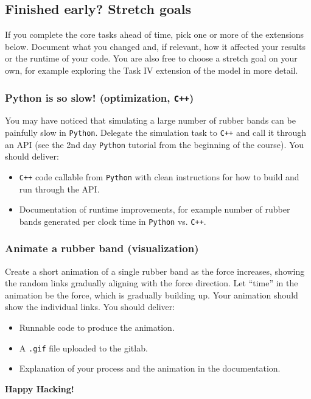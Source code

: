 \documentclass[11pt]{article}
\begin{document}
\subsection*{Finished early? Stretch goals}
If you complete the core tasks ahead of time, pick one or more of the extensions below. Document what you changed and, if relevant, how it affected your results or the runtime of your code. You are also free to choose a stretch goal on your own, for example exploring the Task IV extension of the model in more detail.

\subsubsection*{Python is so slow! (optimization, \texttt{C++})}
You may have noticed that simulating a large number of rubber bands can be painfully slow in \texttt{Python}. Delegate the simulation task to \texttt{C++} and call it through an API (see the 2nd day \texttt{Python} tutorial from the beginning of the course). You should deliver:
\begin{itemize}
  \item \texttt{C++} code callable from \texttt{Python} with clean instructions for how to build and run through the API.
  \item Documentation of runtime improvements, for example number of rubber bands generated per clock time in \texttt{Python} vs. \texttt{C++}.
\end{itemize}

\subsubsection*{Animate a rubber band (visualization)}
Create a short animation of a single rubber band as the force increases, showing the random links gradually aligning with the force direction. Let ``time'' in the animation be the force, which is gradually building up. Your animation should show the individual links. You should deliver:
\begin{itemize}
  \item Runnable code to produce the animation.
  \item A \texttt{.gif} file uploaded to the gitlab.
  \item Explanation of your process and the animation in the documentation.
\end{itemize}

\begin{center}
\textbf{Happy Hacking!}
\end{center}
\end{document}
